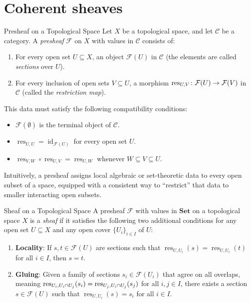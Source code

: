 \documentclass[a4paper]{article}
\begin{document}
\section{Coherent sheaves}

\begin{snippetdefinition}{Presheaf on a Topological Space}
    Let \(X\) be a topological space, and let \(\mathcal{C}\) be a category. A \emph{presheaf} \(\mathcal{F}\) on \(X\) with values in \(\mathcal{C}\) consists of:
    \begin{enumerate}
        \item For every open set \(U \subseteq X\), an object \(\mathcal{F}(U)\) in \(\mathcal{C}\) (the elements are called \emph{sections} over \(U\)).
        \item For every inclusion of open sets \(V \subseteq U\), a morphism \(\operatorname{res}_{U,V} \colon \mathcal{F}(U) \to \mathcal{F}(V)\) in \(\mathcal{C}\) (called the \emph{restriction map}).
    \end{enumerate}
    This data must satisfy the following compatibility conditions:
    \begin{itemize}
        \item \(\mathcal{F}(\emptyset)\) is the terminal object of \(\mathcal{C}\).
        \item \(\operatorname{res}_{U,U} = \operatorname{id}_{\mathcal{F}(U)}\) for every open set \(U\).
        \item \(\operatorname{res}_{V,W} \circ \operatorname{res}_{U,V} = \operatorname{res}_{U,W}\) whenever \(W \subseteq V \subseteq U\).
    \end{itemize}
\end{snippetdefinition}

Intuitively, a presheaf assigns local algebraic or set-theoretic data to every open subset of a space, equipped with a consistent way to ``restrict'' that data to smaller interacting open subsets.

\begin{snippetdefinition}{Sheaf on a Topological Space}
    A presheaf \(\mathcal{F}\) with values in \(\mathbf{Set}\) on a topological space \(X\) is a \emph{sheaf} if it satisfies the following two additional conditions for any open set \(U \subseteq X\) and any open cover \(\{U_i\}_{i \in I}\) of \(U\):
    \begin{enumerate}
        \item \textbf{Locality}: If \(s, t \in \mathcal{F}(U)\) are sections such that \(\operatorname{res}_{U, U_i}(s) = \operatorname{res}_{U, U_i}(t)\) for all \(i \in I\), then \(s = t\).
        \item \textbf{Gluing}: Given a family of sections \(s_i \in \mathcal{F}(U_i)\) that agree on all overlaps, meaning \(\operatorname{res}_{U_i, U_i \cap U_j}(s_i) = \operatorname{res}_{U_j, U_i \cap U_j}(s_j)\) for all \(i, j \in I\), there exists a section \(s \in \mathcal{F}(U)\) such that \(\operatorname{res}_{U, U_i}(s) = s_i\) for all \(i \in I\).
    \end{enumerate}
\end{snippetdefinition}
\end{document}
